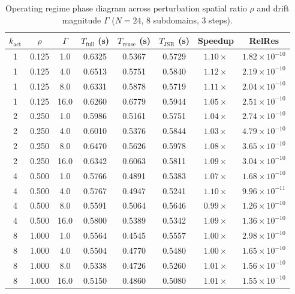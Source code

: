 \documentclass[preprint,12pt,3p]{elsarticle}
\begin{document}
\begin{table}[htbp]
\centering
\small
\caption{Operating regime phase diagram across perturbation spatial ratio $\rho$ and drift magnitude $\Gamma$ ($N=24$, 8 subdomains, 3 steps).}
\label{tab:pillar1_phase}
\begin{tabular}{cccccccc}
\toprule
$k_{\text{act}}$ & $\rho$ & $\Gamma$ & $T_{\text{full}}$ (s) & $T_{\text{reuse}}$ (s) & $T_{\text{JSR}}$ (s) & Speedup & RelRes \\
\midrule
1 & 0.125 & 1.0 & 0.6325 & 0.5367 & 0.5729 & $1.10\times$ & $1.82 \times 10^{-10}$ \\
1 & 0.125 & 4.0 & 0.6513 & 0.5751 & 0.5840 & $1.12\times$ & $2.19 \times 10^{-10}$ \\
1 & 0.125 & 8.0 & 0.6331 & 0.5878 & 0.5719 & $1.11\times$ & $2.04 \times 10^{-10}$ \\
1 & 0.125 & 16.0 & 0.6260 & 0.6779 & 0.5944 & $1.05\times$ & $2.51 \times 10^{-10}$ \\
2 & 0.250 & 1.0 & 0.5986 & 0.5161 & 0.5751 & $1.04\times$ & $2.74 \times 10^{-10}$ \\
2 & 0.250 & 4.0 & 0.6010 & 0.5376 & 0.5844 & $1.03\times$ & $4.79 \times 10^{-10}$ \\
2 & 0.250 & 8.0 & 0.6470 & 0.5626 & 0.5978 & $1.08\times$ & $3.65 \times 10^{-10}$ \\
2 & 0.250 & 16.0 & 0.6342 & 0.6063 & 0.5811 & $1.09\times$ & $3.04 \times 10^{-10}$ \\
4 & 0.500 & 1.0 & 0.5766 & 0.4891 & 0.5383 & $1.07\times$ & $1.68 \times 10^{-10}$ \\
4 & 0.500 & 4.0 & 0.5767 & 0.4947 & 0.5241 & $1.10\times$ & $9.96 \times 10^{-11}$ \\
4 & 0.500 & 8.0 & 0.5591 & 0.5064 & 0.5646 & $0.99\times$ & $1.26 \times 10^{-10}$ \\
4 & 0.500 & 16.0 & 0.5800 & 0.5389 & 0.5342 & $1.09\times$ & $1.36 \times 10^{-10}$ \\
8 & 1.000 & 1.0 & 0.5564 & 0.4545 & 0.5557 & $1.00\times$ & $2.98 \times 10^{-10}$ \\
8 & 1.000 & 4.0 & 0.5504 & 0.4770 & 0.5480 & $1.00\times$ & $1.65 \times 10^{-10}$ \\
8 & 1.000 & 8.0 & 0.5338 & 0.4726 & 0.5260 & $1.01\times$ & $1.56 \times 10^{-10}$ \\
8 & 1.000 & 16.0 & 0.5150 & 0.4860 & 0.5080 & $1.01\times$ & $1.55 \times 10^{-10}$ \\
\bottomrule
\end{tabular}
\end{table}
\end{document}
